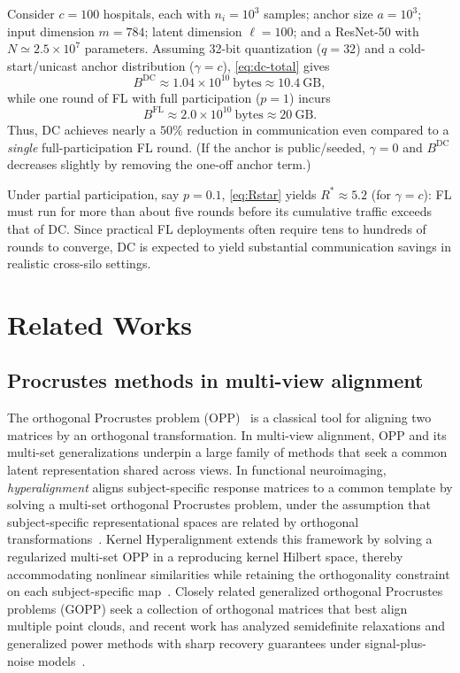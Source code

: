\documentclass[final,3p,times]{elsarticle}
\theoremstyle{plain}
\begin{document}
Consider \(c=100\) hospitals, each with \(n_i=10^{3}\) samples; anchor size \(a=10^{3}\); input dimension \(m=784\); latent dimension \(\ell=100\); and a ResNet-50 with \(N\simeq 2.5\times 10^{7}\) parameters. Assuming 32-bit quantization (\(q=32\)) and a cold-start/unicast anchor distribution (\(\gamma=c\)),
\eqref{eq:dc-total} gives
\begin{equation}
    B^{\mathrm{DC}} \approx 1.04\times 10^{10}\ \text{bytes} \approx 10.4\ \text{GB},
\end{equation}
while one round of FL with full participation (\(p=1\)) incurs
\begin{equation}
    B^{\mathrm{FL}} \approx 2.0\times 10^{10}\ \text{bytes} \approx 20\ \text{GB}.
\end{equation}
Thus, DC achieves nearly a \(50\%\) reduction in communication even compared to a \emph{single} full-participation FL round. (If the anchor is public/seeded, \(\gamma=0\) and \(B^{\mathrm{DC}}\) decreases slightly by removing the one-off anchor term.)

Under partial participation, say \(p=0.1\), \eqref{eq:Rstar} yields \(R^{*}\approx 5.2\) (for \(\gamma=c\)): FL must run for more than about five rounds before its cumulative traffic exceeds that of DC. Since practical FL deployments often require tens to hundreds of rounds to converge, DC is expected to yield substantial communication savings in realistic cross-silo settings.



\section{Related Works}
\label{section: related works}

\subsection{Procrustes methods in multi-view alignment}

The orthogonal Procrustes problem (OPP)~\cite{procrustessolution} is a classical tool for aligning two matrices by an orthogonal transformation. In multi-view alignment, OPP and its multi-set generalizations underpin a large family of methods that seek a common latent representation shared across views. In functional neuroimaging, \emph{hyperalignment} aligns subject-specific response matrices to a common template by solving a multi-set orthogonal Procrustes problem, under the assumption that subject-specific representational spaces are related by orthogonal transformations~\cite{Haxby2011CommonModel}. Kernel Hyperalignment extends this framework by solving a regularized multi-set OPP in a reproducing kernel Hilbert space, thereby accommodating nonlinear similarities while retaining the orthogonality constraint on each subject-specific map~\cite{Lorbert2012KernelHyperalignment}. Closely related generalized orthogonal Procrustes problems (GOPP) seek a collection of orthogonal matrices that best align multiple point clouds, and recent work has analyzed semidefinite relaxations and generalized power methods with sharp recovery guarantees under signal-plus-noise models~\cite{GOPP}. 
\end{document}
